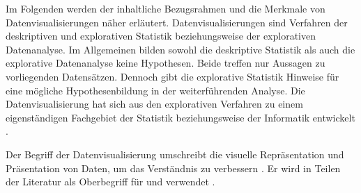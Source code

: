 Im Folgenden werden der inhaltliche Bezugsrahmen und die Merkmale von Datenvisualisierungen näher erläutert.
%
Datenvisualisierungen sind Verfahren der deskriptiven und explorativen Statistik beziehungsweise der explorativen Datenanalyse. 
Im Allgemeinen bilden sowohl die deskriptive Statistik als auch die explorative Datenanalyse keine Hypothesen. Beide treffen nur Aussagen zu vorliegenden Datensätzen. 
Dennoch gibt die explorative Statistik Hinweise für eine mögliche Hypothesenbildung in der weiterführenden Analyse. 
Die Datenvisualisierung hat sich aus den explorativen Verfahren zu einem eigenständigen Fachgebiet der Statistik 
beziehungsweise der Informatik entwickelt \cite[vgl.][28 f.]{becker_stochastische_2016}. 


Der Begriff der Datenvisualisierung umschreibt die visuelle Repräsentation und Präsentation von Daten, um das Verständnis zu verbessern \cite[vgl.][15 ff.]{kirk_data_2019}.
Er wird in Teilen der Literatur als Oberbegriff für  und 
 verwendet \cite[vgl.][11]{few_now_2009}.

